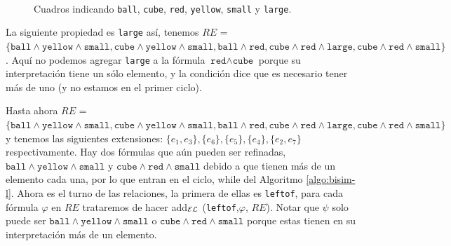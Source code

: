 \begin{figure}[ht]
\begin{center}
\\[0pt]
\caption{Cuadros indicando \texttt{ball}, \texttt{cube}, \texttt{red}, \texttt{yellow}, \texttt{small} y \texttt{large}.}
\label{fig-modelo11}
\end{center}
\end{figure}

La siguiente propiedad es \texttt{large} as\'i, tenemos $RE$ = $\{\texttt{ball} \wedge \texttt{yellow} \wedge \texttt{small}, \texttt{cube} \wedge \texttt{yellow} \wedge \texttt{small}, \texttt{ball} \wedge \texttt{red}, \texttt{cube} \wedge \texttt{red} \wedge \texttt{large}, \texttt{cube} \wedge \texttt{red} \wedge \texttt{small}\}$. Aqu\'i no podemos agregar \texttt{large} a la f\'ormula $\texttt{red} \wedge \texttt{cube}$ porque su interpretaci\'on tiene un s\'olo elemento, y la condici\'on dice que es necesario tener m\'as de uno (y no estamos en el primer ciclo).

Hasta ahora $RE$ = $\{\texttt{ball} \wedge \texttt{yellow} \wedge \texttt{small}, \texttt{cube} \wedge \texttt{yellow} \wedge \texttt{small}, \texttt{ball} \wedge \texttt{red}, \texttt{cube} \wedge \texttt{red} \wedge \texttt{large}, \texttt{cube} \wedge \texttt{red} \wedge \texttt{small}\}$ 
y tenemos las siguientes extensiones: $\{e_1, e_3\}, \{e_6\}, \{e_5\}, \{e_4\}, \{e_2, e_7\}$ respectivamente. 
Hay dos f\'ormulas que a\'un pueden ser refinadas, $\texttt{ball} \wedge \texttt{yellow} \wedge \texttt{small}$ y $\texttt{cube} \wedge \texttt{red} \wedge \texttt{small}$ 
debido a que tienen m\'as de un elemento cada una, por lo que entran en el ciclo, while del Algoritmo \ref{algo:bisim-l}. Ahora es el turno de las relaciones, la primera de ellas es \texttt{leftof}, para cada f\'ormula $\varphi$ en $RE$ trataremos de hacer add$_\mathcal{EL}$ (\texttt{leftof},$\varphi$, $RE$). Notar que $\psi$ solo puede ser $\texttt{ball} \wedge \texttt{yellow} \wedge \texttt{small}$ o $\texttt{cube} \wedge \texttt{red} \wedge \texttt{small}$ porque estas tienen en su interpretaci\'on m\'as de un elemento. 


